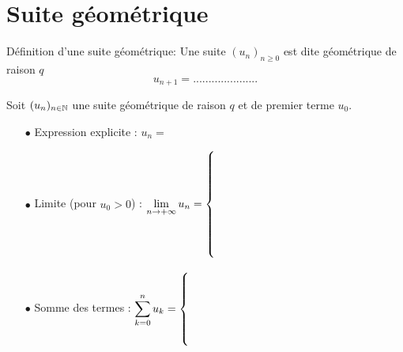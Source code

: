 \documentclass[a4paper, 11pt]{article}
\begin{document}
\section{Suite g\'eom\'etrique}


{  

\begin{defi} D\'efinition d'une suite g\'eom\'etrique:
Une suite $(u_n)_{n\geq 0}$ est dite g\'eom\'etrique de raison $q$
$$ u_{n+1}=.....................$$
\end{defi}

}\vspace{0.3cm}

{  

\begin{prop} Soit $(u_n)_{n\in \mathbb{N}}$ une suite g\'eom\'etrique de raison $q$ et de premier terme $u_0$.\vspace{0.3cm}
\begin{itemize}
\item[$\bullet$] Expression explicite : $u_n =$ 
\item[$\bullet$] Limite (pour $u_0>0$) : $\lim\limits_{n\to +\infty} u_n = \left\{ \begin{array}{c} \vspace*{3cm} \end{array} \right.$
\item[$\bullet$] Somme des termes : $\ddp \sum\limits_{k=0}^n u_k =  \left\{ \begin{array}{c} \vspace*{2cm} \end{array} \right.$
\end{itemize}
\end{prop}

}


\end{document}
